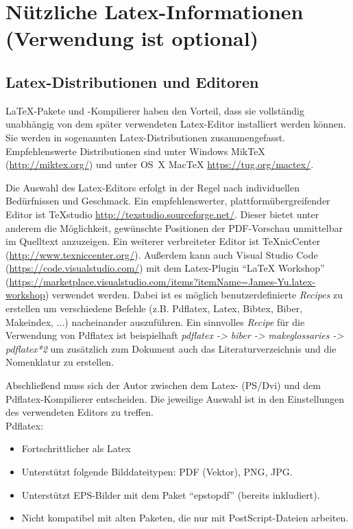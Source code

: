 \chapter[Nützliche Latex-Informationen]{Nützliche Latex-Informationen (Verwendung ist optional)}

\section{Latex-Distributionen und Editoren}

\LaTeX-Pakete und -Kompilierer haben den Vorteil, dass sie vollständig unabhängig von dem später verwendeten Latex-Editor installiert werden können. Sie werden in sogenannten Latex-Distributionen zusammengefasst. Empfehlenswerte Distributionen sind unter Windows MikTeX (\href{http://miktex.org/}{http://miktex.org/}) und unter OS~X MacTeX \href{https://tug.org/mactex/}{https://tug.org/mactex/}.

Die Auswahl des Latex-Editors erfolgt in der Regel nach individuellen Bedürfnissen und Geschmack.
Ein empfehlenswerter, plattformübergreifender Editor ist TeXstudio \href{http://texstudio.sourceforge.net/}{http://texstudio.sourceforge.net/}. Dieser bietet unter anderem die Möglichkeit, gewünschte Positionen der PDF-Vorschau unmittelbar im Quelltext anzuzeigen.
Ein weiterer verbreiteter Editor ist TeXnicCenter (\href{http://www.texniccenter.org/}{http://www.texniccenter.org/}).
Außerdem kann auch Visual Studio Code (\href{https://code.visualstudio.com/}{https://code.visualstudio.com/}) mit dem Latex-Plugin "`LaTeX Workshop"' (\href{https://marketplace.visualstudio.com/items?itemName=James-Yu.latex-workshop}{https://marketplace.visualstudio.com/items?itemName=James-Yu.latex-workshop}) verwendet werden. 
Dabei ist es möglich benutzerdefinierte \textit{Recipes} zu erstellen um verschiedene Befehle (z.B. Pdflatex, Latex, Bibtex, Biber, Makeindex, ...) nacheinander auszuführen.
Ein sinnvolles \textit{Recipe} für die Verwendung von Pdflatex ist beispielhaft \textit{pdflatex -> biber -> makeglossaries -> pdflatex*2} um zusätzlich zum Dokument auch das Literaturverzeichnis und die Nomenklatur zu erstellen.

Abschließend muss sich der Autor zwischen dem Latex- (PS/Dvi) und dem Pdflatex-Kompilierer entscheiden.
Die jeweilige Auswahl ist in den Einstellungen des verwendeten Editors zu treffen.\\

Pdflatex:
\begin{itemize}
	\item Fortschrittlicher als Latex
	\item Unterstützt folgende Bilddateitypen: PDF (Vektor), PNG, JPG.
	\item Unterstützt EPS-Bilder mit dem Paket "`epstopdf"' (bereits inkludiert).
	\item Nicht kompatibel mit alten Paketen, die nur mit PostScript-Dateien arbeiten.
\end{itemize}

